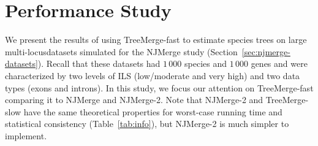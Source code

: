 \section{Performance Study}
\label{sec:methods}
We present the results of using TreeMerge-fast to estimate species trees on large \glspl{multi-locusdataset} simulated for the NJMerge study (Section~\ref{sec:njmerge-datasets}).
Recall that these datasets had $1\,000$ species and $1\,000$ \glspl{gene} and were characterized by two levels of \gls{ILS} (low/moderate and very high) and two data types (\glspl{exon} and \glspl{intron}).
In this study, we focus our attention on TreeMerge-fast comparing it to NJMerge and NJMerge-2.
Note that NJMerge-2 and TreeMerge-slow have the same theoretical properties for worst-case running time and statistical consistency (Table~\ref{tab:info}), but NJMerge-2 is much simpler to implement.


